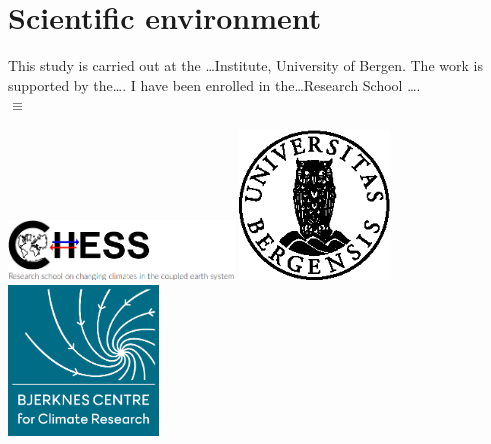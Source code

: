 \chapter{Scientific environment}
This study is carried out at the \ldots Institute, University of Bergen. 
The work is supported by the\ldots. 
I have been enrolled in the\ldots Research School \ldots.\\

$\equiv$

\vspace*{\fill}
\begin{center}
\includegraphics[width=60mm]{figures/CHESS_logo_with_text.png}
\includegraphics[width=40mm]{figures/uglo}
\hspace{1cm}
\includegraphics[width=40mm]{figures/BCCRlogo_square.jpg}

\end{center}





